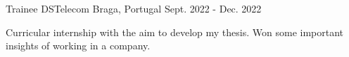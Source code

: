 

\begin{cventries}

\cventry
  {Trainee} %
  {DSTelecom} %
  {Braga, Portugal} %
  {Sept. 2022 - Dec. 2022} %
  {
    \begin{cvitems} %
      \item {Curricular internship with the aim to develop my thesis. Won some important insights of working in a company.}
    \end{cvitems}
}


\end{cventries}
